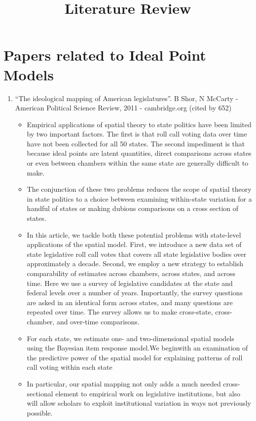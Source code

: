 \documentclass[a4paper,12pt]{article}
\begin{document}
\title{Literature Review}
\maketitle


\section{Papers related to Ideal Point Models}

\begin{enumerate}
\item “The ideological mapping of American legislatures”. B Shor, N McCarty - American Political Science Review, 2011 - cambridge.org (cited by 652)
\begin{itemize}
\item Empirical applications of spatial theory to state politics have been limited by two important factors. The first is that roll call voting data over time have not been collected for all 50 states. The second impediment is that because ideal points are latent quantities, direct comparisons across states or even between chambers within the same state are generally difficult to make. 
\item The conjunction of these two problems reduces the scope of spatial theory in state politics to a choice between examining within-state variation for a handful of states or making dubious comparisons on a cross section of states. 
\item In this article, we tackle both these potential problems with state-level applications of the spatial model. First, we introduce a new data set of state legislative roll call votes that covers all state legislative bodies over approximately a decade. Second, we employ a new strategy to establish comparability of estimates across chambers, across states, and across time. Here we use a survey of legislative candidates at the state and federal levels over a number of years. Importantly, the survey questions are asked in an identical form across states, and many questions are repeated over time. The survey allows us to make cross-state, cross-chamber, and over-time comparisons. 
\item For each state, we estimate one- and two-dimensional spatial models using the Bayesian item response model.We beginwith an examination of the predictive power of the spatial model for explaining patterns of roll call voting within each state
\item In particular, our spatial mapping not only adds a much needed cross-sectional element to empirical work on legislative institutions, but also will allow scholars to exploit institutional variation in ways not previously possible. 

\end{itemize}
\end{enumerate}
\end{document}

